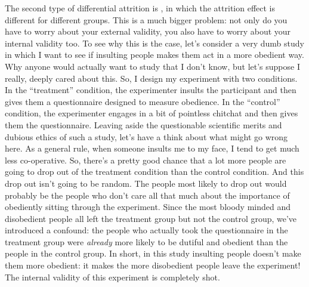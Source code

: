 The second type of differential attrition is , in which the attrition effect is different for different groups. This is a much bigger problem: not only do you have to worry about your external validity, you also have to worry about your internal validity too. To see why this is the case, let's consider a very dumb study in which I want to see if insulting people makes them act in a more obedient way. Why anyone would actually want to study that I don't know, but let's suppose I really, deeply cared about this. So, I design my experiment with two conditions. In the ``treatment'' condition, the experimenter insults the participant and then gives them a questionnaire designed to measure obedience. In the ``control'' condition, the experimenter engages in a bit of pointless chitchat and then gives them the questionnaire. Leaving aside the questionable scientific merits and dubious ethics of such a study, let's have a think about what might go wrong here. As a general rule, when someone insults me to my face, I tend to get much less co-operative. So, there's a pretty good chance that a lot more people are going to drop out of the treatment condition than the control condition. And this drop out isn't going to be random. The people most likely to drop out would probably be the people who don't care all that much about the importance of obediently sitting through the experiment. Since the most bloody minded and disobedient people all left the treatment group but not the control group, we've introduced a confound: the people who actually took the questionnaire in the treatment group were {\it already} more likely to be dutiful and obedient than the people in the control group. In short, in this study insulting people doesn't make them more obedient: it makes the more disobedient people leave the experiment! The internal validity of this experiment is completely shot. 




